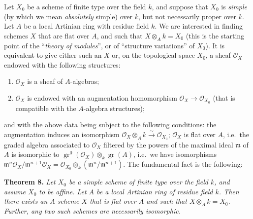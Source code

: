 \documentclass{article}
\newenvironment{itenv}[1]
  {\phantomsection\par\smallskip\noindent\textbf{#1.}\itshape}
  {\par\smallskip}
\newcommand{\oldpage}[1]{\marginpar{\footnotesize$\Big\vert$ \textit{p.~#1}}}
\theoremstyle{definition}
\theoremstyle{definition}
\theoremstyle{definition}
\theoremstyle{definition}
\theoremstyle{remark}
\begin{document}
Let \(X_0\) be a scheme of finite type over the field \(k\), and suppose that \(X_0\) is \emph{simple} (by which we mean \emph{absolutely} simple) over \(k\), but not necessarily proper over \(k\).
Let \(A\) be a local Artinian ring with residue field \(k\).
We are interested in finding schemes \(X\) that are flat over \(A\), and such that \(X\otimes_A k=X_0\) (this is the starting point of the ``\emph{theory of modules}'', or of ``structure variations'' of \(X_0\)).
\oldpage{182-12}It is equivalent to give either such an \(X\) or, on the topological space \(X_0\), a sheaf \({\mathscr{O}}_X\) endowed with the following structures:

\begin{enumerate}
\def\labelenumi{\roman{enumi}.}
\item
  \({\mathscr{O}}_X\) is a sheaf of \(A\)-algebras;
\item
  \({\mathscr{O}}_X\) is endowed with an augmentation homomorphism \({\mathscr{O}}_X\to{\mathscr{O}}_{X_0}\) (that is compatible with the \(A\)-algebra structures);
\end{enumerate}

and with the above data being subject to the following conditions: the augmentation induces an isomorphism \({\mathscr{O}}_X\otimes_A k\xrightarrow{\sim}{\mathscr{O}}_{X_0}\);
\({\mathscr{O}}_X\) is flat over \(A\), i.e.~the graded algebra associated to \({\mathscr{O}}_X\) filtered by the powers of the maximal ideal \({\mathfrak{m}}\) of \(A\) is isomorphic to \(\operatorname{gr}^0({\mathscr{O}}_X)\otimes_k\operatorname{gr}(A)\), i.e.~we have isomorphisms \({\mathfrak{m}}^n{\mathscr{O}}_X/{\mathfrak{m}}^{n+1}{\mathscr{O}}_X = {\mathscr{O}}_{X_0}\otimes_k({\mathfrak{m}}^n/{\mathfrak{m}}^{n+1})\).
The fundamental fact is the following:

\leavevmode{}%
\begin{itenv}{Theorem 8}
Let \(X_0\) be a simple scheme of finite type over the field \(k\), and assume \(X_0\) to be affine.
Let \(A\) be a local Artinian ring of residue field \(k\).
Then there exists an \(A\)-scheme \(X\) that is flat over \(A\) and such that \(X\otimes_A k=X_0\).
Further, any two such schemes are necessarily isomorphic.

\end{itenv}
\end{document}
